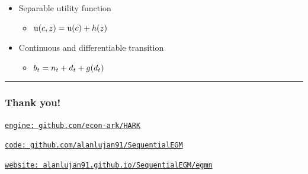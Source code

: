 \documentclass[
  letterpaper,
  DIV=11,
  numbers=noendperiod]{scrartcl}
\providecommand{\tightlist}{%
  \setlength{\itemsep}{0pt}\setlength{\parskip}{0pt}}\usepackage{longtable,booktabs,array}
\begin{document}
\begin{itemize}
\tightlist
\item
  Separable utility function

  \begin{itemize}
  \tightlist
  \item
    \(\mathrm{u}(c, z) = \mathrm{u}(c) + h(z)\)
  \end{itemize}
\item
  Continuous and differentiable transition

  \begin{itemize}
  \tightlist
  \item
    \(b_{t} = n_{t} + d_{t} + g(d_{t})\)
  \end{itemize}
\end{itemize}

\begin{center}\rule{0.5\linewidth}{0.5pt}\end{center}

\hypertarget{thank-you}{%
\subsubsection{Thank you!}\label{thank-you}}

\href{https://github.com/econ-ark/HARK}{\texttt{engine:\ github.com/econ-ark/HARK}}

\href{https://github.com/alanlujan91/SequentialEGM}{\texttt{code:\ github.com/alanlujan91/SequentialEGM}}

\href{https://alanlujan91.github.io/SequentialEGM/egmn}{\texttt{website:\ alanlujan91.github.io/SequentialEGM/egmn}}
\end{document}
